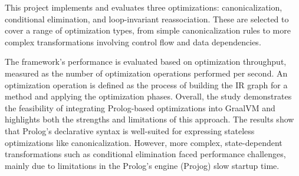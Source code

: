 This project implements and evaluates three optimizations: canonicalization, conditional elimination, and loop-invariant reassociation. These are selected to cover a range of optimization types, from simple canonicalization rules to more complex transformations involving control flow and data dependencies.

The framework’s performance is evaluated based on optimization throughput, measured as the number of optimization operations performed per second.
An optimization operation is defined as the process of building the IR graph for a method and applying the optimization phases.
Overall, the study demonstrates the feasibility of integrating Prolog-based optimizations into GraalVM and highlights both the strengths and limitations of this approach.
The results show that Prolog’s declarative syntax is well-suited for expressing stateless optimizations like canonicalization. However, more complex, state-dependent transformations such as conditional elimination faced performance challenges, mainly due to limitations in the Prolog’s engine (Projog) slow startup time.
